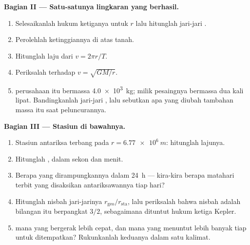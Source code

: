 \begin{problem}
\medskip
\noindent\textbf{Bagian II --- Satu-satunya lingkaran yang berhasil.}
\begin{enumerate}[resume]
  \item Selesaikanlah hukum ketiganya untuk $r$ lalu hitunglah jari-jari
        .
  \item Perolehlah ketinggiannya di atas tanah.
  \item Hitunglah laju  dari $v = 2\pi r/T$.
  \item Periksalah terhadap $v = \sqrt{GM/r}$.
  \item {} perusahaan itu bermassa \qty{4.0e3}{kg}; milik pesaingnya
        bermassa dua kali lipat. Bandingkanlah jari-jari , lalu
        sebutkan apa yang diubah tambahan massa itu saat peluncurannya.
\end{enumerate}

\medskip
\noindent\textbf{Bagian III --- Stasiun di bawahnya.}
\begin{enumerate}[resume]
  \item Stasiun antariksa terbang pada $r = \qty{6.77e6}{m}$: hitunglah
        lajunya.
  \item Hitunglah , dalam sekon dan menit.
  \item Berapa  yang dirampungkannya dalam \qty{24}{h} --- kira-kira
        berapa matahari terbit yang disaksikan antariksawannya tiap hari?
  \item Hitunglah nisbah jari-jarinya $r_{\text{geo}}/r_{\text{sta}}$,
        lalu periksalah bahwa nisbah  adalah bilangan itu
        berpangkat $3/2$, sebagaimana dituntut hukum ketiga Kepler.
  \item {} mana yang bergerak lebih cepat, dan mana yang menuntut lebih
        banyak  tiap  untuk ditempatkan? Rukunkanlah keduanya
        dalam satu kalimat.
\end{enumerate}


\end{problem}
